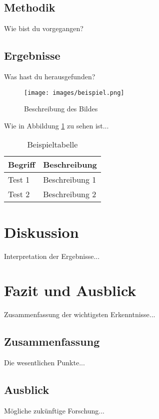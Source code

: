 \documentclass[12pt,a4paper]{article}
\begin{document}
\subsection{Methodik}
Wie bist du vorgegangen?

\subsection{Ergebnisse}
Was hast du herausgefunden?

\begin{figure}[H]
    \centering
    \texttt{[image: images/beispiel.png]}
    \caption{Beschreibung des Bildes}
    \label{fig:beispiel}
\end{figure}

Wie in Abbildung \ref{fig:beispiel} zu sehen ist...

\begin{table}[H]
    \centering
    \begin{tabularx}{0.8\textwidth}{l X}
        \toprule
        \textbf{Begriff} & \textbf{Beschreibung} \\
        \midrule
        Test 1 & Beschreibung 1 \\
        Test 2 & Beschreibung 2 \\
        \bottomrule
    \end{tabularx}
    \caption{Beispieltabelle}
    \label{tab:beispiel}
\end{table}


\section{Diskussion}
Interpretation der Ergebnisse...


\section{Fazit und Ausblick}
Zusammenfassung der wichtigsten Erkenntnisse...

\subsection{Zusammenfassung}
Die wesentlichen Punkte...

\subsection{Ausblick}
Mögliche zukünftige Forschung...


\newpage
\printbibliography[title={Literaturverzeichnis}]

\end{document}
